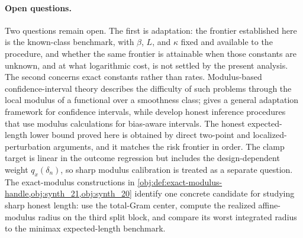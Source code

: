 \paragraph{Open questions.}
Two questions remain open.  The first is adaptation: the frontier established here is the known-class benchmark, with \(\beta\), \(L\), and \(\kappa\) fixed and available to the procedure, and whether the same frontier is attainable when those constants are unknown, and at what logarithmic cost, is not settled by the present analysis.  The second concerns exact constants rather than rates. Modulus-based confidence-interval theory describes the difficulty of such problems through the local modulus of a functional over a smoothness class; \citet{Cai2004} gives a general adaptation framework for confidence intervals, while \citet{ArmstrongKolesar2018OptimalInference,ArmstrongKolesar2020} develop honest inference procedures that use modulus calculations for bias-aware intervals. The honest expected-length lower bound proved here is obtained by direct two-point and localized-perturbation arguments, and it matches the risk frontier in order. The clamp target is linear in the outcome regression but includes the design-dependent weight \(q_x(\delta_n)\), so sharp modulus calibration is treated as a separate question. The exact-modulus constructions in \cref{obj:def:exact-modulus-handle,obj:synth_21,obj:synth_20} identify one concrete candidate for studying sharp honest length: use the total-Gram center, compute the realized affine-modulus radius on the third split block, and compare its worst integrated radius to the minimax expected-length benchmark.

